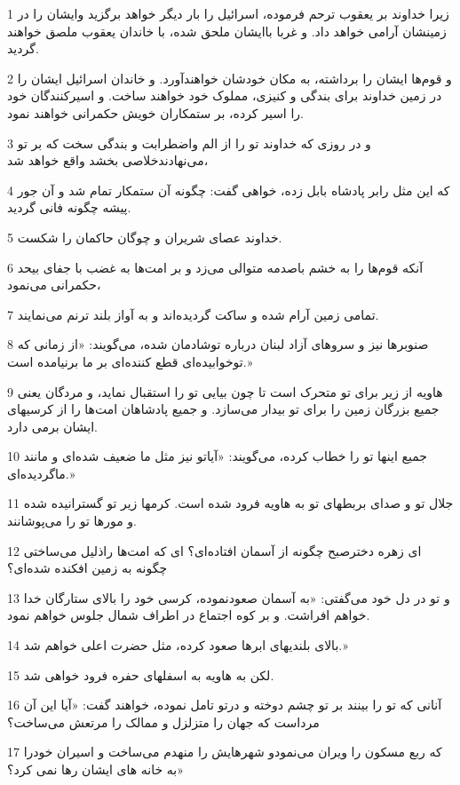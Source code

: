 \par 1 زیرا خداوند بر یعقوب ترحم فرموده، اسرائیل را بار دیگر خواهد برگزید وایشان را در زمینشان آرامی خواهد داد. و غربا باایشان ملحق شده، با خاندان یعقوب ملصق خواهند گردید.
\par 2 و قوم‌ها ایشان را برداشته، به مکان خودشان خواهند‌آورد. و خاندان اسرائیل ایشان را در زمین خداوند برای بندگی و کنیزی، مملوک خود خواهند ساخت. و اسیرکنندگان خود را اسیر کرده، بر ستمکاران خویش حکمرانی خواهند نمود.
\par 3 و در روزی که خداوند تو را از الم واضطرابت و بندگی سخت که بر تو می‌نهادندخلاصی بخشد واقع خواهد شد،
\par 4 که این مثل رابر پادشاه بابل زده، خواهی گفت: چگونه آن ستمکار تمام شد و آن جور پیشه چگونه فانی گردید.
\par 5 خداوند عصای شریران و چوگان حاکمان را شکست.
\par 6 آنکه قوم‌ها را به خشم باصدمه متوالی می‌زد و بر امت‌ها به غضب با جفای بیحد حکمرانی می‌نمود،
\par 7 تمامی زمین آرام شده و ساکت گردیده‌اند و به آواز بلند ترنم می‌نمایند.
\par 8 صنوبرها نیز و سروهای آزاد لبنان درباره توشادمان شده، می‌گویند: «از زمانی که توخوابیده‌ای قطع کننده‌ای بر ما برنیامده است.»
\par 9 هاویه از زیر برای تو متحرک است تا چون بیایی تو را استقبال نماید، و مردگان یعنی جمیع بزرگان زمین را برای تو بیدار می‌سازد. و جمیع پادشاهان امت‌ها را از کرسیهای ایشان برمی دارد.
\par 10 جمیع اینها تو را خطاب کرده، می‌گویند: «آیاتو نیز مثل ما ضعیف شده‌ای و مانند ماگردیده‌ای.»
\par 11 جلال تو و صدای بربطهای تو به هاویه فرود شده است. کرمها زیر تو گسترانیده شده و مورها تو را می‌پوشانند.
\par 12 ‌ای زهره دخترصبح چگونه از آسمان افتاده‌ای؟ ای که امت‌ها راذلیل می‌ساختی چگونه به زمین افکنده شده‌ای؟
\par 13 و تو در دل خود می‌گفتی: «به آسمان صعودنموده، کرسی خود را بالای ستارگان خدا خواهم افراشت. و بر کوه اجتماع در اطراف شمال جلوس خواهم نمود.
\par 14 بالای بلندیهای ابرها صعود کرده، مثل حضرت اعلی خواهم شد.»
\par 15 لکن به هاویه به اسفلهای حفره فرود خواهی شد.
\par 16 آنانی که تو را بینند بر تو چشم دوخته و درتو تامل نموده، خواهند گفت: «آیا این آن مرداست که جهان را متزلزل و ممالک را مرتعش می‌ساخت؟
\par 17 که ربع مسکون را ویران می‌نمودو شهرهایش را منهدم می‌ساخت و اسیران خودرا به خانه های ایشان رها نمی کرد؟»
